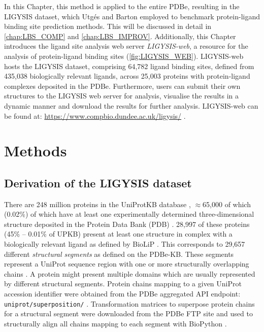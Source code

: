 In this Chapter, this method is applied to the entire PDBe, resulting in the LIGYSIS dataset, which Utgés and Barton \cite{UTGES_2024_LBSCOMP} employed to benchmark protein-ligand binding site prediction methods. This will be discussed in detail in \autoref{chap:LBS_COMP} and \autoref{chap:LBS_IMPROV}. Additionally, this Chapter introduces the ligand site analysis web server \textit{LIGYSIS-web}, a resource for the analysis of protein-ligand binding sites (\autoref{fig:LIGYSIS_WEB}). LIGYSIS-web hosts the LIGYSIS dataset, comprising 64,782 ligand binding sites, defined from 435,038 biologically relevant ligands, across 25,003 proteins with protein-ligand complexes deposited in the PDBe. Furthermore, users can submit their own structures to the LIGYSIS web server for analysis, visualise the results in a dynamic manner and download the results for further analysis. LIGYSIS-web can be found at: \url{https://www.compbio.dundee.ac.uk/ligysis/} \cite{LIGYSIS_SERVER}.

\section{Methods}

\subsection{Derivation of the LIGYSIS dataset}

There are 248 million proteins in the UniProtKB database \cite{UNIPROT_2020_UNIPROT}, $\approx$65,000 of which (0.02\%) of which have at least one experimentally determined three-dimensional structure deposited in the Protein Data Bank (PDB) \cite{ARMSTRONG_2020_PDBE}. 28,997 of these proteins (45\% -- 0.01\% of UPKB) present at least one structure in complex with a biologically relevant ligand as defined by BioLiP \cite{YANG_2013_BIOLIP}. This corresponds to 29,657 different \textit{structural segments} as defined on the PDBe-KB. These segments represent a UniProt sequence region with one or more structurally overlapping chains  \cite{ELLAWAY_2024_CONFORMATIONS}. A protein might present multiple domains which are usually represented by different structural segments. Protein chains mapping to a given UniProt accession identifier were obtained from the PDBe aggregated API endpoint: \texttt{uniprot/superposition/} \cite{SUPP_ENDPOINT, PDBEKB_2019_PDBEKB}. Transformation matrices to superpose protein chains for a structural segment were downloaded from the PDBe FTP site \cite{SUPP_FTP_ENDPOINT, PDBE_2022_PDBEKB} and used to structurally align all chains mapping to each segment with BioPython \cite{COCK_2009_BIOPYTHON}.

